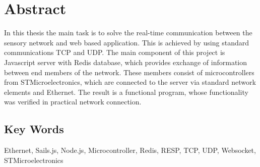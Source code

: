\chapter*{Abstract}
In this thesis the main task is to solve the real-time communication between the sensory network and web based application. This is achieved by using standard communications TCP and UDP. The main component of this project is Javascript server with Redis database, which provides exchange of information between end members of the network. These members consist of microcontrollers from STMicroelectronics, which are connected to the server via standard network elements and Ethernet. The result is a functional program, whose functionality was verified in practical network connection.

\vfill

\section*{Key Words}
Ethernet, Sails.js, Node.js, Microcontroller, Redis, RESP, TCP, UDP, Websocket, STMicroelectronics
